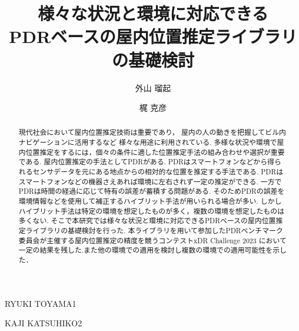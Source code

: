 \documentclass[Japanese]{dicomopapers}
\begin{document}
\title{様々な状況と環境に対応できる\\PDRベースの屋内位置推定ライブラリの基礎検討}



\author{外山 瑠起}{RYUKI TOYAMA}{1}
\author{梶 克彦}{KAJI KATSUHIKO}{2}



\begin{abstract}
	現代社会において屋内位置推定技術は重要であり，
	屋内の人の動きを把握してビル内ナビゲーションに活用するなど
	様々な用途に利用されている.
	多様な状況や環境で屋内位置推定をするには，個々の条件に適した位置推定手法の組み合わせや選択が重要である.
	屋内位置推定の手法としてPDRがある.
	PDRはスマートフォンなどから得られるセンサデータを元にある地点からの相対的な位置を推定する手法である.
	PDRはスマートフォンなどの機器さえあれば環境に左右されず一定の推定ができる.
	一方でPDRは時間の経過に応じて特有の誤差が蓄積する問題がある.
	そのためPDRの誤差を環境情報などを使用して補正するハイブリット手法が用いられる場合が多い.
	しかしハイブリット手法は特定の環境を想定したものが多く，複数の環境を想定したものは多くない.
	そこで本研究では様々な状況と環境に対応できるPDRベースの屋内位置推定ライブラリの基礎検討を行った.
	本ライブラリを用いて参加したPDRベンチマーク委員会が主催する屋内位置推定の精度を競うコンテストxDR Challenge 2023 において
	一定の結果を残した.また他の環境での適用を検討し複数の環境での適用可能性を示した．
\end{abstract}

\maketitle




















\end{document}
